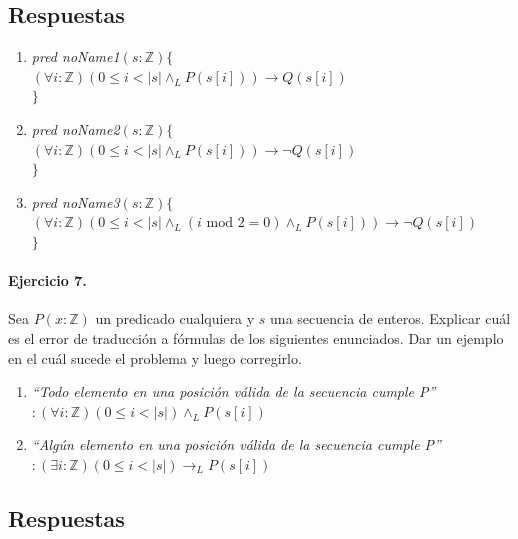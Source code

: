 \documentclass[a4paper]{article}
\begin{document}
\subsection*{Respuestas}
\begin{enumerate}[label=\alph*)]
\item \textit{pred noName1}$(s :\mathbb{Z})\{$\\
\hspace*{6mm}$(\forall i: \mathbb{Z})(0\leq i<|s|\wedge_L P(s[i]))\rightarrow Q(s[i])$\\
$\}$
\item \textit{pred noName2}$(s :\mathbb{Z})\{$\\
\hspace*{6mm}$(\forall i: \mathbb{Z})(0\leq i<|s|\wedge_L P(s[i]))\rightarrow \neg Q(s[i])$\\
$\}$
\item \textit{pred noName3}$(s :\mathbb{Z})\{$\\
\hspace*{6mm}$(\forall i: \mathbb{Z})(0\leq i<|s|\wedge_L (i\textrm{ mod }2 =0)\wedge_L P(s[i]))\rightarrow \neg Q(s[i])$\\
$\}$
\end{enumerate}

\paragraph{Ejercicio 7.} Sea $P(x:\mathbb{Z})$ un predicado cualquiera y $s$ una secuencia de enteros. Explicar cuál es el error de traducción a fórmulas de los siguientes enunciados. Dar un ejemplo en el cuál sucede el problema y luego corregirlo.
\begin{enumerate}[label=\alph*)]
\item \textit{``Todo elemento en una posición válida de la secuencia cumple P''}$:(\forall i: \mathbb{Z})(0\leq i<|s|)\wedge_L P(s[i])$ 
\item \textit{``Algún elemento en una posición válida de la secuencia cumple P''}$:(\exists i: \mathbb{Z})(0\leq i<|s|)\rightarrow_L P(s[i])$ 
\end{enumerate}

\subsection*{Respuestas} 
	
\end{document}
